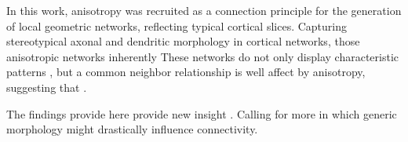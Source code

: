 In this work, anisotropy was recruited as a connection principle for
the generation of local geometric networks, reflecting typical
cortical slices. Capturing stereotypical axonal and dendritic
morphology in cortical networks, those anisotropic networks inherently
These networks do not only display characteristic patterns , but a
common neighbor relationship is well affect by anisotropy, suggesting
that . 

The findings provide here provide new insight . Calling for more in which
generic morphology might drastically influence connectivity.

  







 






